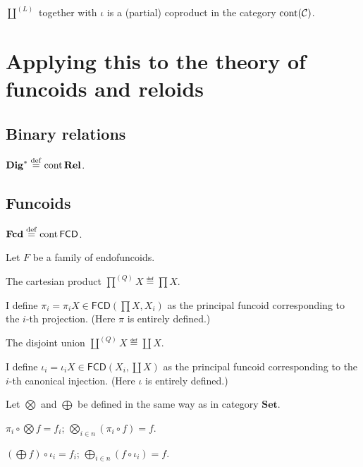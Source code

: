 \begin{thm}
  $\coprod^{(L)}$ together with $\iota$ is a (partial) coproduct in the
  category $\operatorname{cont} (\mathcal{C})$.
\end{thm}

\section{Applying this to the theory of funcoids and reloids}

\subsection{Binary relations}

\begin{defn}
  $\mathbf{Dig}^{\ast} \overset{\mathrm{def}}{=} \operatorname{cont} \mathbf{Rel}$.
\end{defn}

\subsection{Funcoids}

\begin{defn}
  $\mathbf{Fcd} \overset{\mathrm{def}}{=} \operatorname{cont} \mathsf{FCD}$.
\end{defn}

Let $F$ be a family of endofuncoids.

The cartesian product $\prod^{(Q)} X \eqdef \prod X$.

I define $\pi_i = \pi_i X \in \mathsf{FCD} \left( \prod X , X_i
\right)$ as the principal funcoid corresponding to the $i$-th projection.
(Here $\pi$ is entirely defined.)

The disjoint union $\coprod^{(Q)} X \eqdef \coprod X$.

I define $\iota_i = \iota_i X \in \mathsf{FCD} \left( X_i , \coprod X
\right)$ as the principal funcoid corresponding to the $i$-th canonical
injection. (Here $\iota$ is entirely defined.)

Let $\bigotimes$ and $\bigoplus$ be defined in the same way as in category
$\mathbf{Set}$. 

\begin{obvious}
$\pi_i \circ \bigotimes f = f_i$; $\bigotimes_{i \in n} (\pi_i \circ f) =
f$.
\end{obvious}

\begin{obvious}
$\left( \bigoplus f \right) \circ \iota_i = f_i$; $\bigoplus_{i \in n} (f
\circ \iota_i) = f$.
\end{obvious}

